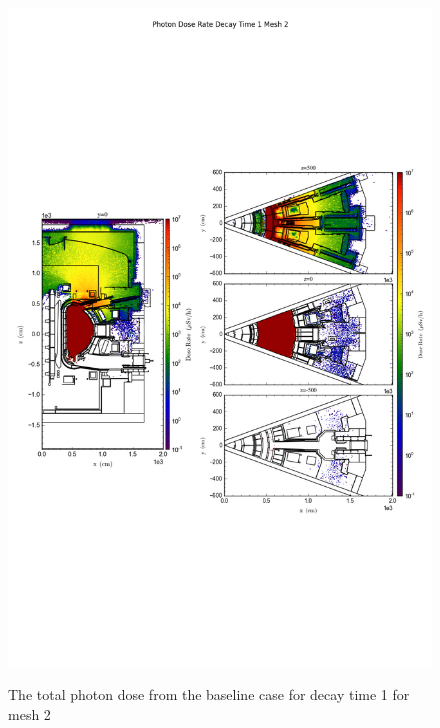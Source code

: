 \begin{figure}[ht!]
\centering
\includegraphics[trim={0cm 9cm 0cm 10cm},clip,scale=0.75]{../plots/final_model/Photon_Dose_Rate_Decay_Time_1_Mesh_2.png}
\label{fig:photons_dc1_no4bc_m2_flux}
\caption{The total photon dose from the baseline case for decay time 1 for mesh 2}
\end{figure}
